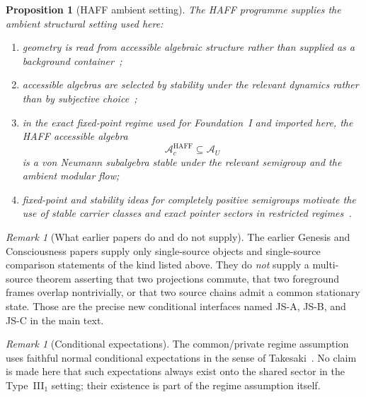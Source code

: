 \documentclass[12pt]{article}
\newtheorem{proposition}[theorem]{Proposition}
\theoremstyle{definition}
\theoremstyle{remark}
\newtheorem{remark}[theorem]{Remark}
\begin{document}
\begin{proposition}[HAFF ambient setting]
\label{prop:appHAFF}
The HAFF programme supplies the ambient structural setting used here:
\begin{enumerate}
\item geometry is read from accessible algebraic structure rather than
  supplied as a background container~\cite{HAFFA};
\item accessible algebras are selected by stability under the relevant
  dynamics rather than by subjective choice~\cite{HAFFD};
\item in the exact fixed-point regime used for Foundation~I and imported
  here, the HAFF accessible algebra
  \[
  \mathcal A_c^{\mathrm{HAFF}}\subseteq \mathcal A_U
  \]
  is a von Neumann subalgebra stable under the relevant semigroup and
  the ambient modular flow;
\item fixed-point and stability ideas for completely positive semigroups
  motivate the use of stable carrier classes and exact pointer sectors
  in restricted regimes~\cite{FrigerioVerri1982,Zurek2003}.
\end{enumerate}
\end{proposition}

\begin{remark}[What earlier papers do and do not supply]
The earlier Genesis and Consciousness papers supply only single-source
objects and single-source comparison statements of the kind listed above.
They do \emph{not} supply a multi-source theorem asserting that two
projections commute, that two foreground frames overlap nontrivially, or
that two source chains admit a common stationary state. Those are the
precise new conditional interfaces named JS-A, JS-B, and JS-C in the
main text.
\end{remark}

\begin{remark}[Conditional expectations]
The common/private regime assumption uses faithful normal conditional
expectations in the sense of Takesaki~\cite{Takesaki1972}. No claim is
made here that such expectations always exist onto the shared sector in
the Type~III\(_1\) setting; their existence is part of the regime
assumption itself.
\end{remark}
 
\newpage
{}
\end{document}
